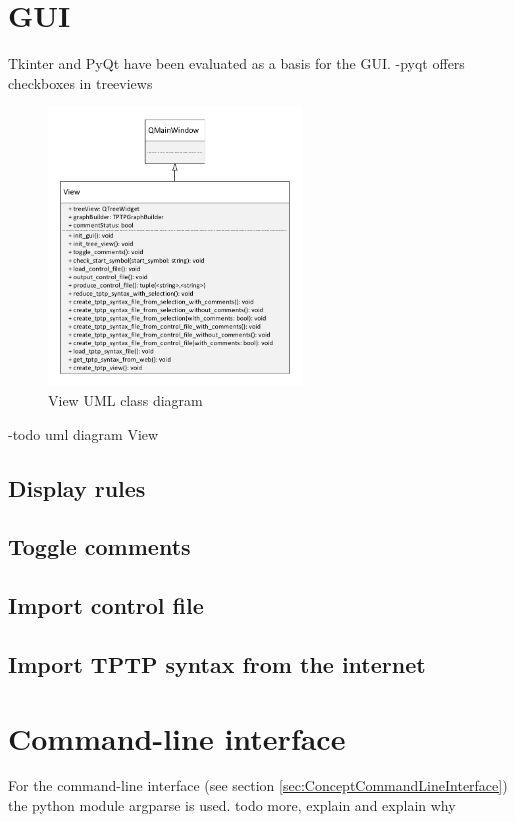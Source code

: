 \section{GUI}\label{sec:ImplementationGUI}
Tkinter and PyQt have been evaluated as a basis for the GUI.
-pyqt offers checkboxes in treeviews
\begin{figure}[H]
\centering
\includegraphics[width=0.6\textwidth]{images/Implementation_view_class_diagramm.pdf}
\caption{View UML class diagram}
\label{fig:ImplementationViewClassDiagram}
\end{figure}
-todo uml diagram View
\subsection{Display rules}\label{sec:ImplementationGUIDisplayRules}

\subsection{Toggle comments}\label{sec:ImplementationGUIToggleComments}
\subsection{Import control file}\label{sec:ImplementationGUIImportControlFile}
\subsection{Import \ac{TPTP} syntax from the internet}\label{sec:GUI}
\section{Command-line interface}\label{sec:ImplementationCommandLineInterface}
For the command-line interface (see section \ref{sec:ConceptCommandLineInterface}) the python module argparse is used.
todo more, explain and explain why

